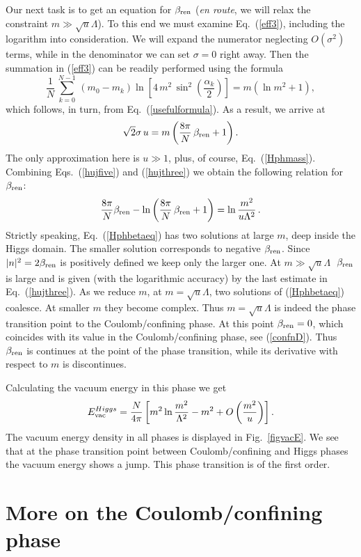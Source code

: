 \documentclass[epsfig,12pt]{article}
\def\beq{\begin{equation}}
\def\eeq{\end{equation}}
\def\beq{\begin{equation}}
\def\eeq{\end{equation}}
\begin{document}
{Our next task is to get an equation for $\beta_{\rm ren}$ ({\em en route}, we will relax 
the constraint $m\gg\sqrt{u}\Lambda$). To this end we must examine Eq.~(\ref{eff3}),
including the logarithm into consideration. We will expand the numerator neglecting $O(\sigma^2)$ terms,
while in the denominator we can set $\sigma =0$ right away. Then the summation in 
(\ref{eff3}) can be readily performed
using the formula
\beq
\frac{1}{N}\,\sum_{k=0}^{N-1}\, \left(m_0-m_k\right)\ln\left[4\,m^2\,\sin^2\left(\frac{\alpha_k}{2}\right)\right]
=m\left(\ln m^2+1\right),
\label{hujfour}
\eeq
which follows, in turn, from Eq.~(\ref{usefulformula}). As a result, we arrive at
\beq
\sqrt{2}\sigma\,u = m\left(\frac{8\pi}{N}\,\beta_{\rm ren} +1\right).
\label{hujfive}
\eeq
The only approximation here is $u\gg 1$, plus, of course, Eq.~(\ref{Hphmass}). Combining Eqs.~(\ref{hujfive})
and (\ref{hujthree}) we obtain the following relation for $\beta_{\rm ren}$:
\beq
\frac{8\pi}{N}\beta_{\rm ren}- \ln{\left(\frac{8\pi}{N}\,\beta_{\rm ren}+1 \right)}=\ln{\frac{m^2}{u\Lambda^2}}  \,.
\label{Hphbetaeq}
\eeq
Strictly speaking, Eq.~(\ref{Hphbetaeq}) has two solutions at large $m$, deep inside the Higgs domain. 
The smaller solution corresponds to  negative $\beta_{\rm ren}$. Since $|n|^2=2\beta_{\rm ren}$ is positively defined we keep only
 the larger one. At $m \gg\sqrt{u}\Lambda\;$ $\beta_{\rm ren}$ is large and is given 
(with the logarithmic accuracy) by the last estimate
in Eq.~(\ref{hujthree}).
As we reduce $m$, at $m = \sqrt{u}\Lambda$, two solutions of (\ref{Hphbetaeq}) coalesce. 
At smaller $m$ they become complex. Thus
$m = \sqrt{u}\Lambda$ is indeed the phase transition point to the Coulomb/confining phase.
At this point $\beta_{\rm ren}=0$, which coincides with its value in the Coulomb/confining phase, see
(\ref{confnD}). Thus $\beta_{\rm ren}$ is continues at the point of the phase transition, while its
derivative with respect to $m$ is discontinues.

Calculating the vacuum energy in this phase we get
\beq
E_{\rm vac}^{Higgs}= \frac{N}{4\pi}\left[ m^2\ln {\frac{m^2}{\Lambda^2}}-m^2 +O\left(\frac{m^2}{u}
\right)\right].
\label{HiggsEvac}
\eeq
The vacuum energy density in all phases is displayed in Fig.~\ref{figvacE}. We see that
at the phase transition point between Coulomb/confining and Higgs phases the vacuum energy shows a jump.
This phase transition is of the first order.


\section{More on the Coulomb/confining phase}
\setcounter{equation}{0}

}
\end{document}
